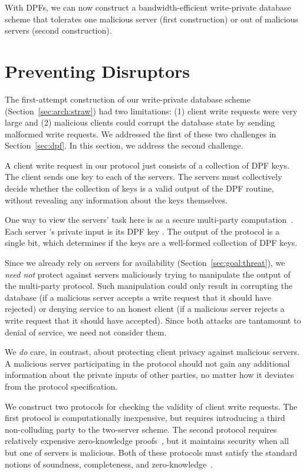 \documentclass[10pt,twocolumn]{article}
\begin{document}
\medskip

With DPFs, we can now construct
a bandwidth-efficient write-private database scheme
that tolerates one malicious server (first construction)
or  out of  malicious servers (second construction).


 \section{Preventing Disruptors}
\label{sec:disrupt}

The first-attempt construction of
our write-private database scheme (Section~\ref{sec:arch:straw})
had two limitations: 
(1) client write requests were very large 
and (2) malicious clients could corrupt the database state
by sending malformed write requests.
We addressed the first of these two challenges
in Section~\ref{sec:dpf}.
In this section, we address the second challenge.

A client write request in our protocol just consists
of a collection of  DPF keys.
The client sends one key to each of the  servers.
The servers must collectively decide whether the collection
of  keys is a valid output of the DPF  routine,
without revealing any information about the keys themselves.

One way to view the servers' task here is as a secure
multi-party computation~\cite{goldreich1987play,yao1982protocols}.
Each server 's private input is its DPF key .
The output of the protocol is a single bit, which determines if the  keys  are a
well-formed collection of DPF keys.

Since we already rely on servers for availability
(Section~\ref{sec:goal:threat}), we {\em need not} protect
against servers maliciously trying to manipulate the 
output of the multi-party protocol.
Such manipulation could only result in corrupting the database 
(if a malicious server accepts a write request that it should
have rejected)
or denying service to an honest client
(if a malicious server rejects a write request that it should
have accepted).
Since both attacks are tantamount to denial of service,
we need not consider them.

We {\em do} care, in contrast, about protecting 
client privacy against malicious servers.
A malicious server participating in the protocol
should not gain any additional information about
the private inputs of other parties, no matter how
it deviates from the protocol specification.

We construct two protocols for checking the validity
of client write requests.
The first protocol is computationally inexpensive, but 
requires introducing a third non-colluding party to 
the two-server scheme. 
The second protocol requires relatively expensive zero-knowledge proofs~\cite{feige1988zero,goldreich1991proofs,goldwasser1989knowledge,rackoff1992non},
but it maintains security when all but one
of  servers is malicious.
Both of these protocols must satisfy the 
standard notions of soundness, completeness, and
zero-knowledge~\cite{camenisch1998group}.
\end{document}
